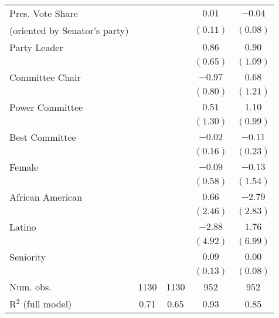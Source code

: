 \documentclass[12pt]{article}
\begin{document}
\begin{table}[!htbp]
\begin{threeparttable}
\begin{tabular}{l c c c c }
Pres. Vote Share                  &             &          & $0.01$      & $-0.04$      \\
  (oriented by Senator's party)   &             &          & $(0.11)$    & $(0.08)$     \\
Party Leader                      &             &          & $0.86$      & $0.90$       \\
                                  &             &          & $(0.65)$    & $(1.09)$     \\
Committee Chair                   &             &          & $-0.97$     & $0.68$       \\
                                  &             &          & $(0.80)$    & $(1.21)$     \\
Power Committee                   &             &          & $0.51$      & $1.10$       \\
                                  &             &          & $(1.30)$    & $(0.99)$     \\
Best Committee                    &             &          & $-0.02$     & $-0.11$      \\
                                  &             &          & $(0.16)$    & $(0.23)$     \\
Female                            &             &          & $-0.09$     & $-0.13$      \\
                                  &             &          & $(0.58)$    & $(1.54)$     \\
African American                  &             &          & $0.66$      & $-2.79$      \\
                                  &             &          & $(2.46)$    & $(2.83)$     \\
Latino                            &             &          & $-2.88$     & $1.76$       \\
                                  &             &          & $(4.92)$    & $(6.99)$     \\
Seniority                         &             &          & $0.09$      & $0.00$       \\
                                  &             &          & $(0.13)$    & $(0.08)$     \\
\hline
Num. obs.                         & 1130        & 1130     & 952         & 952          \\
R$^2$ (full model)                & 0.71        & 0.65     & 0.93        & 0.85         \\

\end{tabular}
\end{threeparttable}
\end{table}
\end{document}
